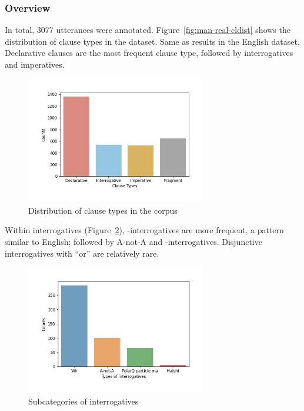 \subsubsection{Overview}
\label{sec:mancl:corpus:results:mapping}

In total, 3077 utterances were annotated. Figure~\ref{fig:man-real-cldist} shows the distribution of clause types in the dataset. Same as results in the English dataset, Declarative clauses are the most frequent clause type, followed by interrogatives and imperatives. 

\begin{figure}[H]
    \centering
    \includegraphics[width=0.7\textwidth]{figures/man-real-cldist.jpg}
    \caption{Distribution of clause types in the corpus}
    \label{fig:man:real-cldist}
\end{figure}

Within interrogatives (Figure~\ref{fig:man:real-subint}), \twh-interrogatives are more frequent, a pattern similar to English; followed by A-not-A and -interrogatives. Disjunctive interrogatives with  ``or'' are relatively rare. 
\begin{figure}[H]
    \centering
    \includegraphics[width=0.7\textwidth]{figures/man-real-subint.jpg}
    \caption{Subcategories of interrogatives}
    \label{fig:man:real-subint}
\end{figure}

